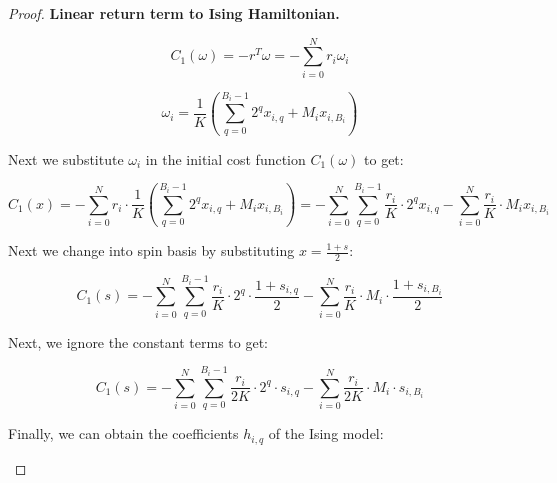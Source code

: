 \documentclass[12pt,a4paper]{report}
\begin{document}
\begin{proof}
\textbf{Linear return term to Ising Hamiltonian.}

\noindent\begin{minipage}{.45\textwidth}
\[ C_1(\omega) = -r^T \omega = - \sum_{i=0}^{N} r_i \omega_i \]
\end{minipage}%
\begin{minipage}{.55\textwidth}
\[ \omega_i = \frac{1}{K} \left( \sum_{q=0}^{B_i - 1} 2^q x_{i, q} + M_i x_{i, B_i} \right) \]
\end{minipage}

\begin{center}
Next we substitute \(\omega_i\) in the initial cost function \(C_1(\omega)\) to get:
\end{center}

\[ C_1(x) = - \sum_{i=0}^{N} r_i \cdot \frac{1}{K} \left( \sum_{q=0}^{B_i-1} 2^q x_{i, q} + M_i x_{i, B_i} \right) = - \sum_{i=0}^{N} \sum_{q=0}^{B_i - 1} \frac{r_i}{K} \cdot 2^q x_{i, q} - \sum_{i=0}^{N} \frac{r_i}{K} \cdot M_i x_{i, B_i}\]

\begin{center}
Next we change into spin basis by substituting \(x = \frac{1 + s}{2}\):
\end{center}

\[ C_1(s) = - \sum_{i=0}^{N} \sum_{q=0}^{B_i - 1} \frac{r_i}{K} \cdot 2^q \cdot \frac{1+s_{i, q}}{2} - \sum_{i=0}^{N} \frac{r_i}{K} \cdot M_i \cdot \frac{1+s_{i, B_i}}{2} \]

\begin{center}
Next, we ignore the constant terms to get:
\end{center}

\[ C_1(s) = - \sum_{i=0}^{N} \sum_{q=0}^{B_i - 1} \frac{r_i}{2K} \cdot 2^q \cdot s_{i, q} - \sum_{i=0}^{N} \frac{r_i}{2K} \cdot M_i \cdot s_{i, B_i} \]

\begin{center}
Finally, we can obtain the coefficients \( h_{i, q} \) of the Ising model:
\end{center}

\begin{center}
\end{center}
\end{proof}
\end{document}
